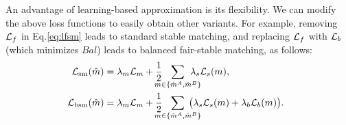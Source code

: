 An advantage of learning-based approximation is its flexibility. We can modify the above loss functions to easily obtain other variants. For example, removing ${\mathcal L}_{f}$ in Eq.\eqref{eq:lfsm} leads to standard stable matching, and replacing ${\mathcal L}_{f}$ with ${\mathcal L}_{b}$ (which minimizes $Bal$) leads to balanced fair-stable matching, as follows:
\begin{align}
\hspace{-0.5em}    \loss_{\rm sm}(\hat{m}) &= \lambda_m\loss_m \label{eq:lsm} + \frac{1}{2}\hspace{-1.0em}\sum_{m\in \{\hat{m}^A,\hat{m}^B\}}\hspace{-1.3em}\lambda_s\loss_s(m),\\
%
\hspace{-0.5em}    \loss_{\rm bsm}(\hat{m}) &=  \lambda_m\loss_m + \frac{1}{2}\hspace{-1.0em}\sum_{m\in \{\hat{m}^A,\hat{m}^B\}}\hspace{-1.3em}\bigl(\lambda_s\loss_s(m) + \lambda_b\loss_{b}(m)\bigr). \label{eq:lbsm}
\end{align}


